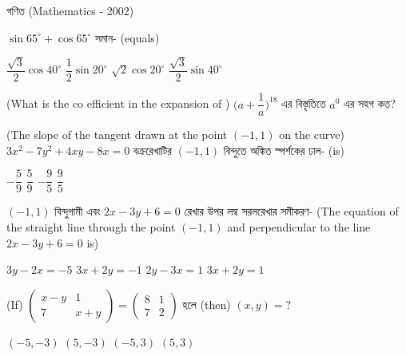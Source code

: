 \documentclass[addpoints]{exam}
\begin{document}
\begin{LARGE}
\begin{center}
গণিত (Mathematics - 2002)
\end{center}
\end{LARGE}
\begin{questions}

\question  $ \sin 65^{\circ} + \cos 65^{\circ} $ সমান- (equals)

\begin{oneparchoices}
\choice $ \dfrac{\sqrt{3}}{2}\cos 40^{\circ} $
\choice $ \dfrac{1}{2}\sin 20^{\circ} $
\choice $ \sqrt{2}\cos 20^{\circ} $
\choice $ \dfrac{\sqrt{3}}{2}\sin 40^{\circ} $
\end{oneparchoices}

\question  (What is the co efficient in the expansion of ) $ \Big(a+\dfrac{1}{a}\Big)^{18} $  এর বিস্তৃতিতে $ a^{0} $ এর সহগ কত? 

\begin{oneparchoices}
\end{oneparchoices}

\question (The slope of the tangent drawn at the point $ (-1,1) $ on the curve) $ 3x^{2}-7y^{2}+4xy-8x=0 $ বক্ররেখাটির $ (-1,1) $ বিন্দুতে অঙ্কিত স্পর্শকের ঢাল- (is)

\begin{oneparchoices}
\choice $ -\dfrac{5}{9} $
\choice $ \dfrac{5}{9} $
\choice $ -\dfrac{9}{5} $
\choice $ \dfrac{9}{5} $
\end{oneparchoices}



\question $ (-1,1) $  বিন্দুগামী এবং $ 2x-3y+6=0 $ রেখার উপর লম্ব সরলরেখার সমীকরণ- (The equation of the straight line through the point $ (-1,1) $ and perpendicular to the line $ 2x-3y+6=0 $ is) 

\begin{oneparchoices}
\choice $ 3y-2x=-5 $
\choice $ 3x+2y=-1 $
\choice $ 2y-3x=1 $
\choice $ 3x+2y=1 $
\end{oneparchoices}

\question  (If) $ \begin{pmatrix}
x-y & 1\\
7 & x+y
\end{pmatrix} = \begin{pmatrix}
8 & 1\\
7 & 2
\end{pmatrix} $ হলে (then) $ (x,y)=? $ 

\begin{oneparchoices}
\choice $ (-5,-3) $
\choice $ (5,-3) $
\choice $ (-5,3) $
\choice $ (5,3) $
\end{oneparchoices}


\end{questions}
\end{document}
